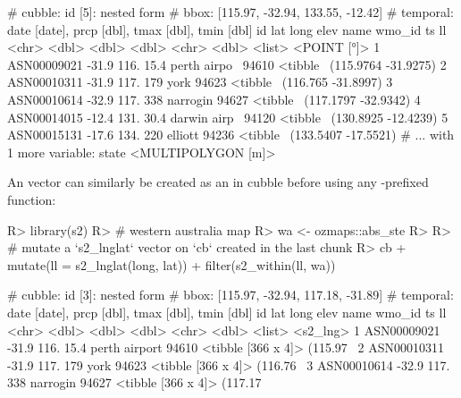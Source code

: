 \documentclass[
]{jss}
\begin{document}
\begin{CodeChunk}
\begin{CodeOutput}
# cubble:   id [5]: nested form
# bbox:     [115.97, -32.94, 133.55, -12.42]
# temporal: date [date], prcp [dbl], tmax [dbl], tmin [dbl]
  id            lat  long  elev name         wmo_id ts                        ll
  <chr>       <dbl> <dbl> <dbl> <chr>         <dbl> <list>           <POINT [°]>
1 ASN00009021 -31.9  116.  15.4 perth airpo~  94610 <tibble~ (115.9764 -31.9275)
2 ASN00010311 -31.9  117. 179   york          94623 <tibble~  (116.765 -31.8997)
3 ASN00010614 -32.9  117. 338   narrogin      94627 <tibble~ (117.1797 -32.9342)
4 ASN00014015 -12.4  131.  30.4 darwin airp~  94120 <tibble~ (130.8925 -12.4239)
5 ASN00015131 -17.6  134. 220   elliott       94236 <tibble~ (133.5407 -17.5521)
# ... with 1 more variable: state <MULTIPOLYGON [m]>
\end{CodeOutput}
\end{CodeChunk}

An   vector can similarly be created as an
 in cubble before using any -prefixed function:

\begin{CodeChunk}
\begin{CodeInput}
R> library(s2)
R> # western australia map
R> wa <- ozmaps::abs_ste %
R> 
R> # mutate a `s2_lnglat` vector on `cb` created in the last chunk
R> cb %
+   mutate(ll = s2_lnglat(long, lat)) %
+   filter(s2_within(ll, wa))
\end{CodeInput}
\begin{CodeOutput}
# cubble:   id [3]: nested form
# bbox:     [115.97, -32.94, 117.18, -31.89]
# temporal: date [date], prcp [dbl], tmax [dbl], tmin [dbl]
  id            lat  long  elev name          wmo_id ts                 ll      
  <chr>       <dbl> <dbl> <dbl> <chr>          <dbl> <list>             <s2_lng>
1 ASN00009021 -31.9  116.  15.4 perth airport  94610 <tibble [366 x 4]> (115.97~
2 ASN00010311 -31.9  117. 179   york           94623 <tibble [366 x 4]> (116.76~
3 ASN00010614 -32.9  117. 338   narrogin       94627 <tibble [366 x 4]> (117.17~
\end{CodeOutput}
\end{CodeChunk}
\end{document}
